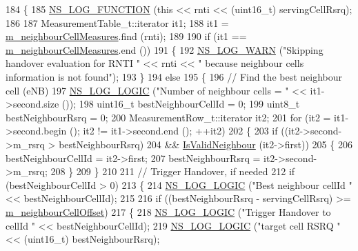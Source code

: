 \begin{DoxyCode}
184 \{
185   \hyperlink{log-macros-disabled_8h_a90b90d5bad1f39cb1b64923ea94c0761}{NS\_LOG\_FUNCTION} (\textcolor{keyword}{this} << rnti << (uint16\_t) servingCellRsrq);
186 
187   MeasurementTable\_t::iterator it1;
188   it1 = \hyperlink{classns3_1_1A2A4RsrqHandoverAlgorithm_ab02d6372aec766c1d6e7611111456fa4}{m\_neighbourCellMeasures}.find (rnti);
189 
190   \textcolor{keywordflow}{if} (it1 == \hyperlink{classns3_1_1A2A4RsrqHandoverAlgorithm_ab02d6372aec766c1d6e7611111456fa4}{m\_neighbourCellMeasures}.end ())
191     \{
192       \hyperlink{group__logging_gade7208b4009cdf0e25783cd26766f559}{NS\_LOG\_WARN} (\textcolor{stringliteral}{"Skipping handover evaluation for RNTI "} << rnti << \textcolor{stringliteral}{" because neighbour cells
       information is not found"});
193     \}
194   \textcolor{keywordflow}{else}
195     \{
196       \textcolor{comment}{// Find the best neighbour cell (eNB)}
197       \hyperlink{group__logging_ga88acd260151caf2db9c0fc84997f45ce}{NS\_LOG\_LOGIC} (\textcolor{stringliteral}{"Number of neighbour cells = "} << it1->second.size ());
198       uint16\_t bestNeighbourCellId = 0;
199       uint8\_t bestNeighbourRsrq = 0;
200       MeasurementRow\_t::iterator it2;
201       \textcolor{keywordflow}{for} (it2 = it1->second.begin (); it2 != it1->second.end (); ++it2)
202         \{
203           \textcolor{keywordflow}{if} ((it2->second->m\_rsrq > bestNeighbourRsrq)
204               && \hyperlink{classns3_1_1A2A4RsrqHandoverAlgorithm_a6d9106afebe16783ac637e9672a2fae1}{IsValidNeighbour} (it2->first))
205             \{
206               bestNeighbourCellId = it2->first;
207               bestNeighbourRsrq = it2->second->m\_rsrq;
208             \}
209         \}
210 
211       \textcolor{comment}{// Trigger Handover, if needed}
212       \textcolor{keywordflow}{if} (bestNeighbourCellId > 0)
213         \{
214           \hyperlink{group__logging_ga88acd260151caf2db9c0fc84997f45ce}{NS\_LOG\_LOGIC} (\textcolor{stringliteral}{"Best neighbour cellId "} << bestNeighbourCellId);
215 
216           \textcolor{keywordflow}{if} ((bestNeighbourRsrq - servingCellRsrq) >= \hyperlink{classns3_1_1A2A4RsrqHandoverAlgorithm_afe15ce0bd178565ef3f42d83ada4428b}{m\_neighbourCellOffset})
217             \{
218               \hyperlink{group__logging_ga88acd260151caf2db9c0fc84997f45ce}{NS\_LOG\_LOGIC} (\textcolor{stringliteral}{"Trigger Handover to cellId "} << bestNeighbourCellId);
219               \hyperlink{group__logging_ga88acd260151caf2db9c0fc84997f45ce}{NS\_LOG\_LOGIC} (\textcolor{stringliteral}{"target cell RSRQ "} << (uint16\_t) bestNeighbourRsrq);

\end{DoxyCode}
